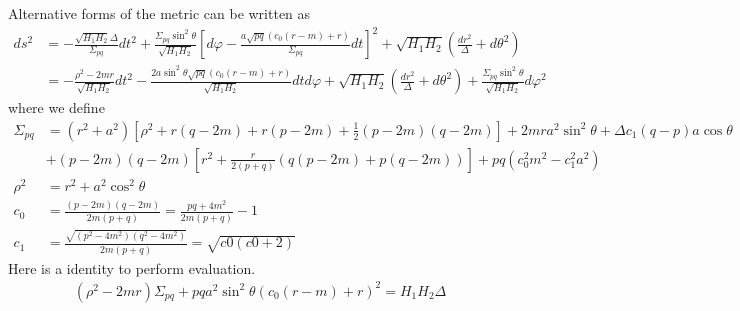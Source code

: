 \documentclass[prd]{revtex4}
\begin{document}
Alternative forms of the metric can be written as
\begin{align}
ds^2 &= -\frac{\sqrt{H_1 H_2} \Delta}{\Sigma_{pq}} dt^2 + \frac{\Sigma_{pq} \sin^2 \theta}{\sqrt{H_1 H_2}} \left[d\varphi - \frac{a \sqrt{pq} (c_0 (r-m) +r)}{\Sigma_{pq}} dt \right]^2 + \sqrt{H_1 H_2} \left(\frac{dr^2}{\Delta} + d\theta^2 \right) \\
        &=-\frac{\rho^2 - 2mr}{\sqrt{H_1 H_2}} dt^2 - \frac{2a \sin^2 \theta \sqrt{pq} (c_0(r-m) +r)}{\sqrt{H_1 H_2}} dt d\varphi + \sqrt{H_1 H_2} \left( \frac{dr^2}{\Delta} + d\theta^2 \right) + \frac{\Sigma_{pq} \sin^2 \theta}{\sqrt{H_1 H_2}} d\varphi^2
\end{align}
where we define
\begin{align}
\Sigma_{pq} &= (r^2 + a^2) \left[\rho^2 + r(q-2m) + r(p-2m) + \frac{1}{2} (p-2m)(q-2m) \right] + 2mra^2 \sin^2 \theta + \Delta c_1 (q-p) a \cos \theta \nonumber \\
                    &+ (p-2m)(q-2m) \left[r^2 + \frac{r}{2(p+q)} (q(p-2m) + p(q-2m)) \right] + pq (c_0^2 m^2 - c_1^2 a^2)\\
\rho^2 &= r^2 + a^2 \cos^2 \theta \\
c_0 &= \frac{(p-2m)(q-2m)}{2m(p+q)} = \frac{pq +4m^2}{2m(p+q)} - 1 \\
c_1 &=\frac{\sqrt{(p^2 - 4m^2)(q^2 - 4m^2)}}{2m(p+q)} = \sqrt{c0 (c0+2)} 
\end{align}
Here is a identity to perform evaluation.
\begin{align}
(\rho^2 - 2mr) \Sigma_{pq} + pq a^2 \sin^2 \theta(c_0 (r-m) +r)^2 = H_1 H_2 \Delta
\end{align}
\end{document}
